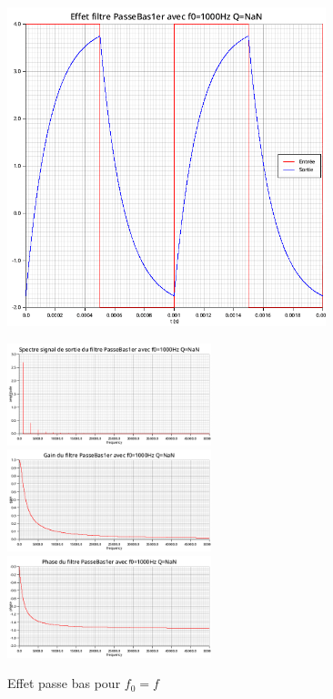 \documentclass{article}
\begin{document}
\begin{figure}[H]
  \begin{minipage}{0.6\textwidth}
      \centering
      \includegraphics[width=25em]{images/creneau/bas/1/signals.png}
  \end{minipage}
  \begin{minipage}{0.3\textwidth}
      \centering
      \includegraphics[width=16em]{images/creneau/bas/1/fft_out.png}
      \vfill
      \includegraphics[width=16em]{images/creneau/bas/1/gain.png}
      \vfill
      \includegraphics[width=16em]{images/creneau/bas/1/phase.png}
  \end{minipage}
  \caption{Effet passe bas pour $f_0=f$}
\end{figure}
\end{document}
